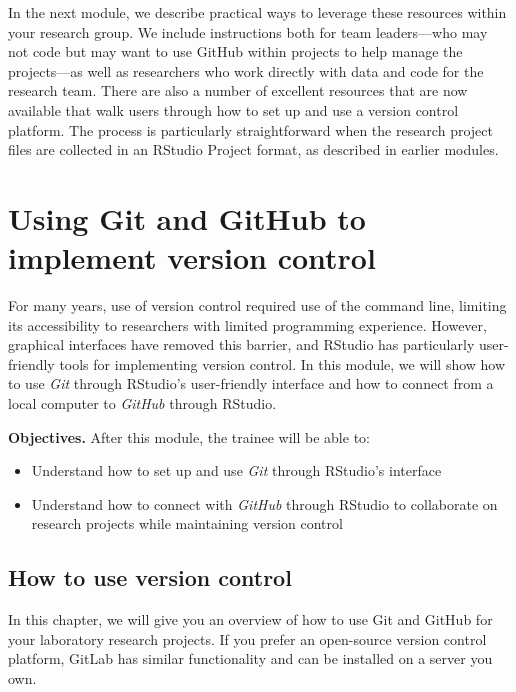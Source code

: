 \documentclass[]{tufte-book}
\providecommand{\tightlist}{%
  \setlength{\itemsep}{0pt}\setlength{\parskip}{0pt}}
\begin{document}
In the next module, we describe practical ways to leverage these resources
within your research group. We include instructions both for team leaders---who
may not code but may want to use GitHub within projects to help manage the
projects---as well as researchers who work directly with data and code for the
research team. There are also a number of excellent resources that are now
available that walk users through how to set up and use a version control
platform. The process is particularly straightforward when the research project
files are collected in an RStudio Project format, as described in earlier
modules.

\section{Using Git and GitHub to implement version control}\label{module11}

For many years, use of version control required use of the command line,
limiting its accessibility to researchers with limited programming experience.
However, graphical interfaces have removed this barrier, and RStudio has
particularly user-friendly tools for implementing version control. In this
module, we will show how to use \emph{Git} through RStudio's user-friendly
interface and how to connect from a local computer to \emph{GitHub} through
RStudio.

\textbf{Objectives.} After this module, the trainee will be able to:

\begin{itemize}
\tightlist
\item
  Understand how to set up and use \emph{Git} through RStudio's interface
\item
  Understand how to connect with \emph{GitHub} through RStudio to collaborate on\\
  research projects while maintaining version control
\end{itemize}

\subsection{How to use version control}\label{how-to-use-version-control}

In this chapter, we will give you an overview of how to use Git and GitHub
for your laboratory research projects. If you prefer an open-source version
control platform, GitLab has similar functionality and can be installed on
a server you own.
\end{document}
